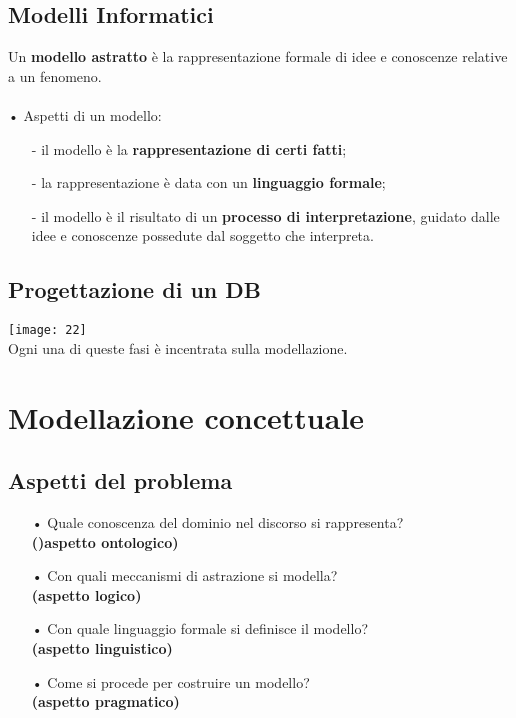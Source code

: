 \documentclass[12pt, letterpaper]{article}
\begin{document}
\subsection{Modelli Informatici}
Un \textbf{modello astratto} è la rappresentazione formale di idee e
conoscenze relative a un fenomeno.
\\
\\
• Aspetti di un modello:
\begin{itemize}
   \item[-] il modello è la \textbf{rappresentazione di certi fatti};
   \item[-] la rappresentazione è data con un \textbf{linguaggio formale};
   \item[-] il modello è il risultato di un \textbf{processo di interpretazione}, guidato dalle idee
e conoscenze possedute dal soggetto che interpreta.
\end{itemize}

\subsection{Progettazione di un DB}

\texttt{[image: 22]}
\\
Ogni una di queste fasi è incentrata sulla modellazione.

\newpage

\section{Modellazione concettuale}

\subsection{Aspetti del problema}

\begin{itemize}
   \item[•] Quale conoscenza del dominio nel discorso si rappresenta?\\
      \textbf{()aspetto ontologico)}
   \item[•] Con quali meccanismi di astrazione si modella?\\
      \textbf{(aspetto logico)}
   \item[•] Con quale linguaggio formale si definisce il modello?\\
      \textbf{(aspetto linguistico)}
   \item[•] Come si procede per costruire un modello?\\
      \textbf{(aspetto pragmatico)}
\end{itemize}
\end{document}
